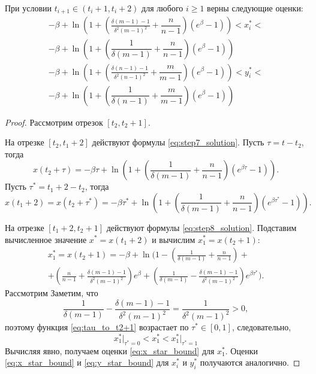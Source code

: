 \begin{lemma}
	\label{lm:xy_star_bounds}
	При условии $t_{i + 1} \in (t_i + 1, t_i + 2)$ для любого $i \geqslant 1$ верны следующие оценки:
	\footnotesize
	\begin{multline}
		\label{eq:x_star_bound}
		-\beta + \ln\left(1 + \left( \frac{\delta(m - 1) - 1}{\delta^2 (m - 1)^2} + \dfrac{n}{n - 1} \right)(e^{\beta} - 1) \right) < x^*_i < \\ -\beta + \ln\left(1 + \left( \dfrac{1}{\delta(m - 1)} + \dfrac{n}{n - 1} \right)(e^{\beta} - 1) \right)
	\end{multline}
	\begin{multline}
		\label{eq:y_star_bound}
		-\beta + \ln\left(1 + \left( \frac{\delta(n - 1) - 1}{\delta^2 (n - 1)^2} + \dfrac{m}{m - 1} \right)(e^{\beta} - 1) \right) < y^*_i < \\ -\beta + \ln\left(1 + \left( \dfrac{1}{\delta(n - 1)} + \dfrac{m}{m - 1} \right)(e^{\beta} - 1) \right)
	\end{multline}
	\normalsize
\end{lemma}
\begin{proof}
	Рассмотрим отрезок $[t_2, t_2 + 1]$.
	
	На отрезке $[t_2, t_1 + 2]$ действуют формулы \eqref{eq:step7_solution}. Пусть $\tau = t - t_2$, тогда
	\[
	x(t_2 + \tau) = - \beta \tau + \ln\left( 1 + \left(\dfrac{1}{\delta(m - 1)} + \dfrac{n}{n - 1}\right) (e^{\beta \tau} - 1) \right).
	\]
	Пусть $\tau^* = t_1 + 2 - t_2$, тогда
	\[
	x(t_1 + 2) = x(t_2 + \tau^*) = -\beta \tau^* + \ln\left( 1 + \left(\dfrac{1}{\delta(m - 1)} + \dfrac{n}{n - 1}\right) (e^{\beta \tau^*} - 1) \right).
	\]
	
	На отрезке $[t_1 + 2, t_2 + 1]$ действуют формулы \eqref{eq:step8_solution}. Подставим вычисленное значение $x^* = x(t_1 + 2)$ и вычислим $x^*_1 = x(t_2 + 1)$:
	\begin{multline}
		\label{eq:tau_to_t2+1}
		x^*_1 = x(t_2 + 1) = -\beta + \ln\Bigg( 1 - \left(\frac{1}{\delta(m - 1)} + \frac{n}{n - 1}\right) + \\ + \left(\frac{n}{n - 1} + \frac{\delta(m - 1) - 1}{\delta^2 (m - 1)^2}\right) e^{\beta} + \left(\frac{1}{\delta(m - 1)} - \frac{\delta(m - 1) - 1}{\delta^2 (m - 1)^2}\right) e^{\beta \tau^*} \Bigg).
	\end{multline}
	Рассмотрим 
	Заметим, что 
	\[
	\frac{1}{\delta(m - 1)} - \frac{\delta(m - 1) - 1}{\delta^2 (m - 1)^2} = \frac{1}{\delta^2 (m - 1)^2} > 0,
	\]
	поэтому функция \eqref{eq:tau_to_t2+1} возрастает по $\tau^* \in [0, 1]$, следовательно, 
	\[
	x^*_1 \vert_{\tau^* = 0} < x^*_1 < x^*_1 \vert_{\tau^* = 1}
	\]
	Вычисляя явно, получаем оценки \eqref{eq:x_star_bound} для $x_1^*$. Оценки \eqref{eq:x_star_bound} и \eqref{eq:y_star_bound} для $x_i^*$ и $y_i^*$ получаются аналогично. 
	
\end{proof}

